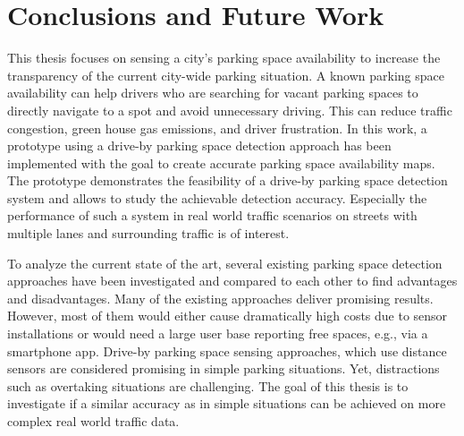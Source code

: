 \chapter{Conclusions and Future Work}
\label{chap:conclusion}



This thesis focuses on sensing a city's parking space availability to increase the transparency of the current city-wide parking situation. 
A known parking space availability can help drivers who are searching for vacant parking spaces to directly navigate to a spot and avoid unnecessary driving. This can reduce traffic congestion, green house gas emissions, and driver frustration. 
In this work, a prototype using a drive-by parking space detection approach has been implemented with the goal to create accurate parking space availability maps. The prototype demonstrates the feasibility of a drive-by parking space detection system and allows to study the achievable detection accuracy. Especially the performance of such a system in real world traffic scenarios on streets with multiple lanes and surrounding traffic is of interest.

To analyze the current state of the art, several existing parking space detection approaches have been investigated and compared to each other to find advantages and disadvantages.
Many of the existing approaches deliver promising results. However, most of them would either cause dramatically high costs due to sensor installations or would need a large user base reporting free spaces, e.g., via a smartphone app.
Drive-by parking space sensing approaches, which use distance sensors are considered promising in simple parking situations. Yet, distractions such as overtaking situations are challenging. 
The goal of this thesis is to investigate if a similar accuracy as in simple situations can be achieved on more complex real world traffic data.

